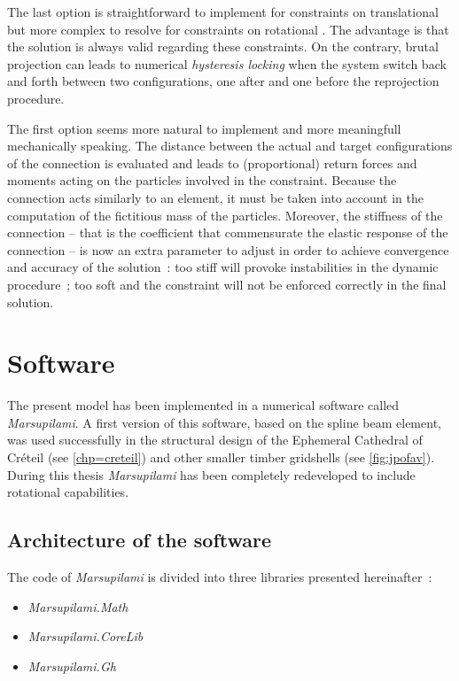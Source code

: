 The last option is straightforward to implement for constraints on translational \dofs{} but more complex to resolve for constraints on rotational \dofs{}. The advantage is that the solution is always valid regarding these constraints. On the contrary, brutal projection can leads to numerical \emph{hysteresis locking} when the system switch back and forth between two configurations, one after and one before the reprojection procedure.

The first option seems more natural to implement and more meaningfull mechanically speaking. The distance between the actual and target configurations of the connection is evaluated and leads to (proportional) return forces and moments acting on the  particles involved in the constraint. Because the connection acts similarly to an element, it must be taken into account in the computation of the fictitious mass of the particles. Moreover, the stiffness of the connection -- that is the coefficient that commensurate the elastic response of the connection -- is now an extra parameter to adjust in order to achieve convergence and accuracy of the solution~: too stiff will provoke instabilities in the dynamic procedure~; too soft and the constraint will not be enforced correctly in the final solution.

\section{Software}\label{sec=software}
The present model has been implemented in a numerical software called \emph{Marsupilami}. A first version of this software, based on the  spline beam element, was used successfully in the structural design of the Ephemeral Cathedral of Créteil (see \cref{chp=creteil}) and other smaller timber gridshells (see \cref{fig:jpofav}). During this thesis \emph{Marsupilami} has been completely redeveloped to include rotational \dofs{} capabilities.

\subsection{Architecture of the software}
The code of \emph{Marsupilami} is divided into three libraries presented hereinafter~:
\begin{itemize}
\item \textit{Marsupilami.Math}
\item \textit{Marsupilami.CoreLib}
\item \textit{Marsupilami.Gh}
\end{itemize}

